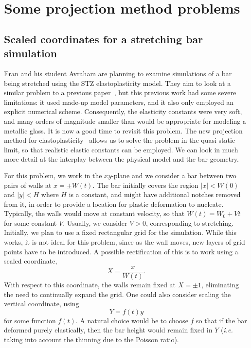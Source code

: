 \documentclass[12pt]{article}
\begin{document}
\section*{Some projection method problems}
\subsection*{Scaled coordinates for a stretching bar simulation}
Eran and his student Avraham are planning to examine simulations of a bar being
stretched using the STZ elastoplasticity model. They aim to look at a similar
problem to a previous paper~\cite{rycroft12}, but this previous work had some
severe limitations: it used made-up model parameters, and it also only employed
an explicit numerical scheme. Consequently, the elasticity constants were very
soft, and many orders of magnitude smaller than would be appropriate for
modeling a metallic glass. It is now a good time to revisit this problem. The
new projection method for elastoplasticity~\cite{rycroft15} allows us to solve
the problem in the quasi-static limit, so that realistic elastic constants can
be employed. We can look in much more detail at the interplay between the
physical model and the bar geometry.

For this problem, we work in the $xy$-plane and we consider a bar between two
pairs of walls at $x=\pm W(t)$. The bar initially covers the region $|x|<W(0)$
and $|y|<H$ where $H$ is a constant, and might have additional notches removed
from it, in order to provide a location for plastic deformation to nucleate.
Typically, the walls would move at constant velocity, so that $W(t)=W_0+Vt$ for
some constant $V$. Usually, we consider $V>0$, corresponding to stretching.
Initially, we plan to use a fixed rectangular grid for the simulation. While
this works, it is not ideal for this problem, since as the wall moves, new
layers of grid points have to be introduced. A possible rectification of this
is to work using a scaled coordinate,
\begin{equation}
X= \frac{x}{W(t)}.
\end{equation}
With respect to this coordinate, the walls remain fixed at $X=\pm 1$,
eliminating the need to continually expand the grid. One could also consider
scaling the vertical coordinate, using
\begin{equation}
Y= f(t) y
\end{equation}
for some function $f(t)$. A natural choice would be to choose $f$ so that if
the bar deformed purely elastically, then the bar height would remain fixed in
$Y$ (\textit{i.e.} taking into account the thinning due to the Poisson ratio).
\end{document}
